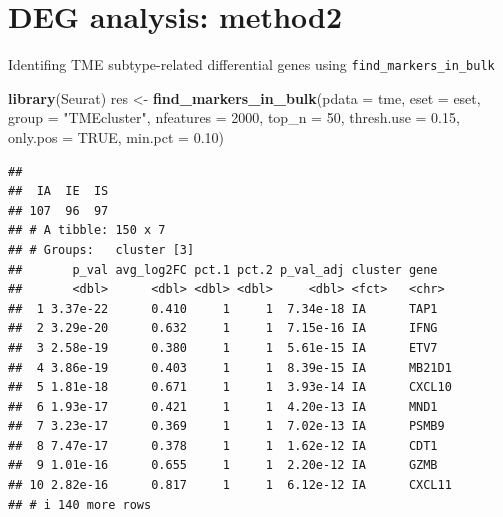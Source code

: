 \documentclass[
  12pt,
]{book}
\newenvironment{Shaded}{\begin{snugshade}}{\end{snugshade}}
\newcommand{\AttributeTok}[1]{\textcolor[rgb]{0.13,0.29,0.53}{#1}}
\newcommand{\ConstantTok}[1]{\textcolor[rgb]{0.56,0.35,0.01}{#1}}
\newcommand{\DecValTok}[1]{\textcolor[rgb]{0.00,0.00,0.81}{#1}}
\newcommand{\FloatTok}[1]{\textcolor[rgb]{0.00,0.00,0.81}{#1}}
\newcommand{\FunctionTok}[1]{\textcolor[rgb]{0.13,0.29,0.53}{\textbf{#1}}}
\newcommand{\NormalTok}[1]{#1}
\newcommand{\OtherTok}[1]{\textcolor[rgb]{0.56,0.35,0.01}{#1}}
\newcommand{\SpecialCharTok}[1]{\textcolor[rgb]{0.81,0.36,0.00}{\textbf{#1}}}
\newcommand{\StringTok}[1]{\textcolor[rgb]{0.31,0.60,0.02}{#1}}
\begin{document}
\hypertarget{deg-analysis-method2}{%
\section{DEG analysis: method2}\label{deg-analysis-method2}}

Identifing TME subtype-related differential genes using \texttt{find\_markers\_in\_bulk}

\begin{Shaded}
\begin{Highlighting}[]
\FunctionTok{library}\NormalTok{(Seurat)}
\NormalTok{res }\OtherTok{\textless{}{-}} \FunctionTok{find\_markers\_in\_bulk}\NormalTok{(}\AttributeTok{pdata      =}\NormalTok{ tme, }
                            \AttributeTok{eset       =}\NormalTok{ eset, }
                            \AttributeTok{group      =} \StringTok{"TMEcluster"}\NormalTok{, }
                            \AttributeTok{nfeatures  =} \DecValTok{2000}\NormalTok{, }
                            \AttributeTok{top\_n      =} \DecValTok{50}\NormalTok{, }
                            \AttributeTok{thresh.use =} \FloatTok{0.15}\NormalTok{, }
                            \AttributeTok{only.pos   =} \ConstantTok{TRUE}\NormalTok{, }
                            \AttributeTok{min.pct    =} \FloatTok{0.10}\NormalTok{)}
\end{Highlighting}
\end{Shaded}

\begin{verbatim}
## 
##  IA  IE  IS 
## 107  96  97 
## # A tibble: 150 x 7
## # Groups:   cluster [3]
##       p_val avg_log2FC pct.1 pct.2 p_val_adj cluster gene  
##       <dbl>      <dbl> <dbl> <dbl>     <dbl> <fct>   <chr> 
##  1 3.37e-22      0.410     1     1  7.34e-18 IA      TAP1  
##  2 3.29e-20      0.632     1     1  7.15e-16 IA      IFNG  
##  3 2.58e-19      0.380     1     1  5.61e-15 IA      ETV7  
##  4 3.86e-19      0.403     1     1  8.39e-15 IA      MB21D1
##  5 1.81e-18      0.671     1     1  3.93e-14 IA      CXCL10
##  6 1.93e-17      0.421     1     1  4.20e-13 IA      MND1  
##  7 3.23e-17      0.369     1     1  7.02e-13 IA      PSMB9 
##  8 7.47e-17      0.378     1     1  1.62e-12 IA      CDT1  
##  9 1.01e-16      0.655     1     1  2.20e-12 IA      GZMB  
## 10 2.82e-16      0.817     1     1  6.12e-12 IA      CXCL11
## # i 140 more rows
\end{verbatim}

\begin{Shaded}
\end{Shaded}
\end{document}
